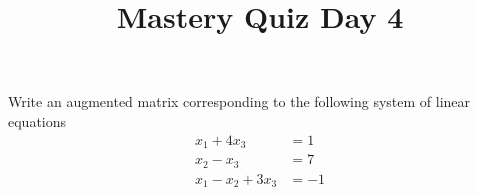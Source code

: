 \documentclass{sbgLAquiz}
\title{Mastery Quiz Day 4 }
\begin{document}
\begin{problem}[E1]
Write an augmented matrix corresponding to the following system of linear equations
\begin{align*}
x_1+4x_3 &= 1 \\
x_2-x_3 &= 7 \\
x_1-x_2+3x_3 &= -1
\end{align*}
\end{problem}
\end{document}
